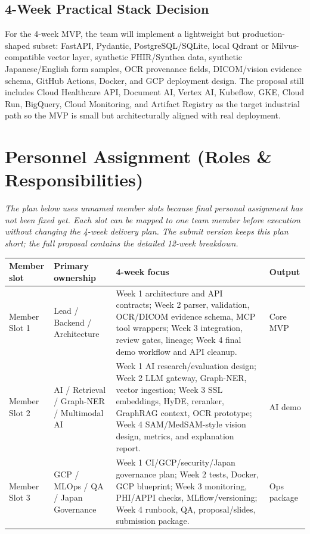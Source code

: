 \documentclass[11pt,a4paper]{article}
\begin{document}
\subsection{4-Week Practical Stack Decision}

For the 4-week MVP, the team will implement a lightweight but production-shaped subset: FastAPI, Pydantic, PostgreSQL/SQLite, local Qdrant or Milvus-compatible vector layer, synthetic FHIR/Synthea data, synthetic Japanese/English form samples, OCR provenance fields, DICOM/vision evidence schema, GitHub Actions, Docker, and GCP deployment design. The proposal still includes Cloud Healthcare API, Document AI, Vertex AI, Kubeflow, GKE, Cloud Run, BigQuery, Cloud Monitoring, and Artifact Registry as the target industrial path so the MVP is small but architecturally aligned with real deployment.

\section{Personnel Assignment (Roles \& Responsibilities)}

\textit{The plan below uses unnamed member slots because final personal assignment has not been fixed yet. Each slot can be mapped to one team member before execution without changing the 4-week delivery plan. The submit version keeps this plan short; the full proposal contains the detailed 12-week breakdown.}

{\small
\setlength{\tabcolsep}{3pt}
\begin{longtable}{p{}p{}p{}p{}}
\toprule
\textbf{Member slot} & \textbf{Primary ownership} & \textbf{4-week focus} & \textbf{Output} \\
\midrule
Member Slot 1 & Lead / Backend / Architecture & Week 1 architecture and API contracts; Week 2 parser, validation, OCR/DICOM evidence schema, MCP tool wrappers; Week 3 integration, review gates, lineage; Week 4 final demo workflow and API cleanup. & Core MVP \\
Member Slot 2 & AI / Retrieval / Graph-NER / Multimodal AI & Week 1 AI research/evaluation design; Week 2 LLM gateway, Graph-NER, vector ingestion; Week 3 SSL embeddings, HyDE, reranker, GraphRAG context, OCR prototype; Week 4 SAM/MedSAM-style vision design, metrics, and explanation report. & AI demo \\
Member Slot 3 & GCP / MLOps / QA / Japan Governance & Week 1 CI/GCP/security/Japan governance plan; Week 2 tests, Docker, GCP blueprint; Week 3 monitoring, PHI/APPI checks, MLflow/versioning; Week 4 runbook, QA, proposal/slides, submission package. & Ops package \\
\bottomrule
\end{longtable}
}
\end{document}
